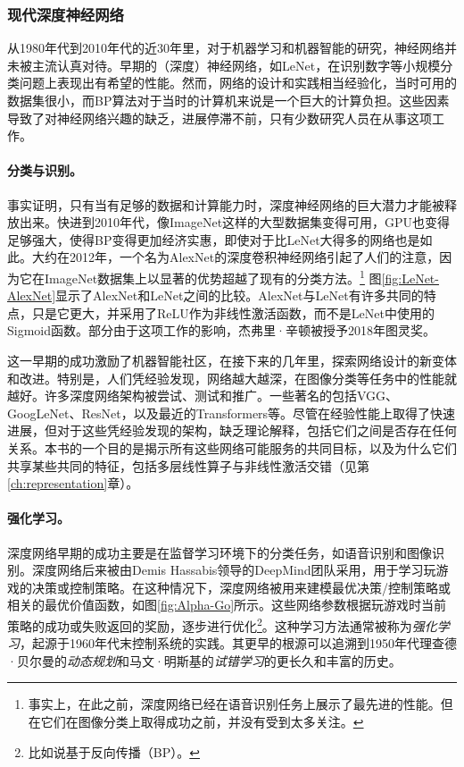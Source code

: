 \documentclass[../../book-main_zh.tex]{subfiles}
\begin{document}
\subsubsection{现代深度神经网络}
从1980年代到2010年代的近30年里，对于机器学习和机器智能的研究，神经网络并未被主流认真对待。早期的（深度）神经网络，如LeNet，在识别数字等小规模分类问题上表现出有希望的性能。然而，网络的设计和实践相当经验化，当时可用的数据集很小，而BP算法对于当时的计算机来说是一个巨大的计算负担。这些因素导致了对神经网络兴趣的缺乏，进展停滞不前，只有少数研究人员在从事这项工作。

\paragraph{分类与识别。}
事实证明，只有当有足够的数据和计算能力时，深度神经网络的巨大潜力才能被释放出来。快进到2010年代，像ImageNet这样的大型数据集变得可用，GPU也变得足够强大，使得BP变得更加经济实惠，即使对于比LeNet大得多的网络也是如此。大约在2012年，一个名为AlexNet的深度卷积神经网络引起了人们的注意，因为它在ImageNet数据集上以显著的优势超越了现有的分类方法\cite{krizhevsky2012imagenet}。\footnote{事实上，在此之前，深度网络已经在语音识别任务上展示了最先进的性能。但在它们在图像分类上取得成功之前，并没有受到太多关注。} 图\ref{fig:LeNet-AlexNet}显示了AlexNet和LeNet之间的比较。AlexNet与LeNet有许多共同的特点，只是它更大，并采用了ReLU作为非线性激活函数，而不是LeNet中使用的Sigmoid函数。部分由于这项工作的影响，杰弗里·辛顿被授予2018年图灵奖。


这一早期的成功激励了机器智能社区，在接下来的几年里，探索网络设计的新变体和改进。特别是，人们凭经验发现，网络越大越深，在图像分类等任务中的性能就越好。许多深度网络架构被尝试、测试和推广。一些著名的包括VGG\cite{Simonyan15}、GoogLeNet\cite{Szegedy2014GoingDW}、ResNet\cite{He2016-lc}，以及最近的Transformers\cite{vaswani2017attention}等。尽管在经验性能上取得了快速进展，但对于这些凭经验发现的架构，缺乏理论解释，包括它们之间是否存在任何关系。本书的一个目的是揭示所有这些网络可能服务的共同目标，以及为什么它们共享某些共同的特征，包括多层线性算子与非线性激活交错（见第\ref{ch:representation}章）。

\paragraph{强化学习。}
深度网络早期的成功主要是在监督学习环境下的分类任务，如语音识别和图像识别。深度网络后来被由Demis Hassabis领导的DeepMind团队采用，用于学习玩游戏的决策或控制策略。在这种情况下，深度网络被用来建模最优决策/控制策略或相关的最优价值函数，如图\ref{fig:Alpha-Go}所示。这些网络参数根据玩游戏时当前策略的成功或失败返回的奖励，逐步进行优化\footnote{比如说基于反向传播（BP）。}。这种学习方法通常被称为{\em 强化学习}\cite{Sutton-Barto}，起源于1960年代末控制系统的实践\cite{Waltz1965AHA,Mendel1970ReinforcementlearningCA}。其更早的根源可以追溯到1950年代理查德·贝尔曼的{\em 动态规划}\cite{Bellman-DP}和马文·明斯基的{\em 试错学习}\cite{Minsky-1954}的更长久和丰富的历史。
\end{document}
